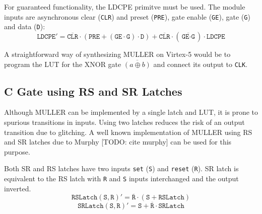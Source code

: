 For guaranteed functionality, the LDCPE primitve must be used. 
The module inputs are asynchronous clear (\texttt{CLR}) and preset
(\texttt{PRE}), gate enable (\texttt{GE}), gate (\texttt{G}) and data
(\texttt{D}):
\begin{equation}\label{eq:virtex_latch}
	\texttt{LDCPE}' = \overline{\texttt{CLR}} \cdot 
	(\texttt{PRE} + (\texttt{GE} \cdot \texttt{G}) \cdot \texttt{D}) +
	\overline{\texttt{CLR}} \cdot 
	(\overline{\texttt{GE} \cdot \texttt{G}}) \cdot \texttt{LDCPE}
\end{equation}

A straightforward way of synthesizing MULLER on Virtex-5 would be to program
the LUT for the XNOR gate $\overline{(a \oplus b)}$ and connect its output to
\texttt{CLK}.

\subsection{C Gate using RS and SR Latches}

Although MULLER can be implemented by a single latch and LUT, it is prone
to spurious transitions in inputs. 
Using two latches reduces the risk of an output transition due to glitching.
A well known implementation of MULLER using RS and SR latches due to Murphy
[TODO: cite murphy] can be used for this purpose.

Both SR and RS latches have two inputs \texttt{set} (\texttt{S}) and
\texttt{reset} (\texttt{R}). 
SR latch is equivalent to the RS latch with \texttt{R} and \texttt{S} inputs
interchanged and the output inverted.
\begin{equation}\label{eq:rslatch}
	\texttt{RSLatch}(\texttt{S},\texttt{R})' 
	= \overline{\texttt{R}} \cdot (\texttt{S} + \texttt{RSLatch})
\end{equation}
\begin{equation}\label{eq:srlatch}
	\texttt{SRLatch}(\texttt{S},\texttt{R})' 
	= \texttt{S} + \overline{\texttt{R}} \cdot \texttt{SRLatch}
\end{equation}


